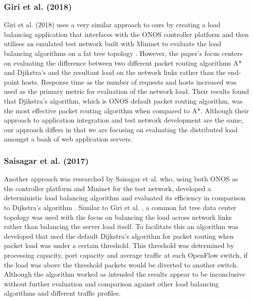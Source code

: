 \subsubsection{Giri et al. (2018)}
Giri et al. (2018) uses a very similar approach to ours by creating a load balancing application that interfaces with the ONOS controller platform and then utilises an emulated test network built with Mininet to evaluate the load balancing algorithms on a fat tree topology \cite{performanceSDN}. However, the paper's focus centers on evaluating the difference between two different packet routing algorithms A* and Djikstra's and the resultant load on the network links rather than the end-point hosts\cite{performanceSDN}. Response time as the number of requests and hosts increased was used as the primary metric for evaluation of the network load. Their results found that Djikstra's algorithm, which is ONOS default packet routing algorithm, was the most effective packet routing algorithm when compared to A*\cite{performanceSDN}. Although their approach to application integration and test network development are the same, our approach differs in that we are focusing on evaluating the distributed load amongst a bank of web application servers.

\subsubsection{ Saisagar et al. (2017)}
Another approach was researched by Saisagar et al. who, using both ONOS as the controller platform and Mininet for the test network, developed a deterministic load balancing algorithm and evaluated its efficiency in comparison to Dijkstra's algorithm \cite{saisagar2017sdn}. Similar to Giri et al.  \cite{performanceSDN}, a common fat tree data center topology was used with the focus on balancing the load across network links rather than balancing the server load itself\cite{saisagar2017sdn}. To facilitate this an algorithm was developed that used the default Dijkstra's algorithm for packet routing when packet load was under a certain threshold\cite{saisagar2017sdn}. This threshold was determined by processing capacity, port capacity and average traffic at each OpenFlow switch, if the load was above the threshold packets would be diverted to another switch\cite{saisagar2017sdn}. Although the algorithm worked as intended the results appear to be inconclusive without further evaluation and comparison against other load balancing algorithms and different traffic profiles. 